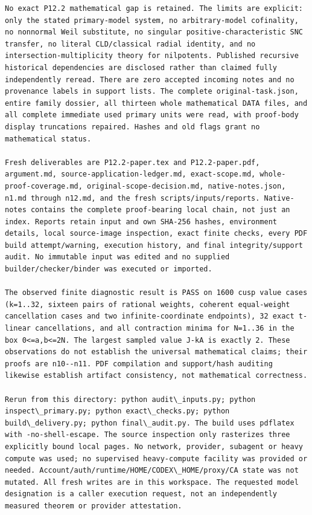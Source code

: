 \documentclass[11pt]{article}
\begin{document}
\begin{Verbatim}[breaklines,fontsize=\tiny]
No exact P12.2 mathematical gap is retained. The limits are explicit: only the stated primary-model system, no arbitrary-model cofinality, no nonnormal Weil substitute, no singular positive-characteristic SNC transfer, no literal CLD/classical radial identity, and no intersection-multiplicity theory for nilpotents. Published recursive historical dependencies are disclosed rather than claimed fully independently reread. There are zero accepted incoming notes and no provenance labels in support lists. The complete original-task.json, entire family dossier, all thirteen whole mathematical DATA files, and all complete immediate used primary units were read, with proof-body display truncations repaired. Hashes and old flags grant no mathematical status.

Fresh deliverables are P12.2-paper.tex and P12.2-paper.pdf, argument.md, source-application-ledger.md, exact-scope.md, whole-proof-coverage.md, original-scope-decision.md, native-notes.json, n1.md through n12.md, and the fresh scripts/inputs/reports. Native-notes contains the complete proof-bearing local chain, not just an index. Reports retain input and own SHA-256 hashes, environment details, local source-image inspection, exact finite checks, every PDF build attempt/warning, execution history, and final integrity/support audit. No immutable input was edited and no supplied builder/checker/binder was executed or imported.

The observed finite diagnostic result is PASS on 1600 cusp value cases (k=1..32, sixteen pairs of rational weights, coherent equal-weight cancellation cases and two infinite-coordinate endpoints), 32 exact t-linear cancellations, and all contraction minima for N=1..36 in the box 0<=a,b<=2N. The largest sampled value J-kA is exactly 2. These observations do not establish the universal mathematical claims; their proofs are n10--n11. PDF compilation and support/hash auditing likewise establish artifact consistency, not mathematical correctness.

Rerun from this directory: python audit\_inputs.py; python inspect\_primary.py; python exact\_checks.py; python build\_delivery.py; python final\_audit.py. The build uses pdflatex with -no-shell-escape. The source inspection only rasterizes three explicitly bound local pages. No network, provider, subagent or heavy compute was used; no supervised heavy-compute facility was provided or needed. Account/auth/runtime/HOME/CODEX\_HOME/proxy/CA state was not mutated. All fresh writes are in this workspace. The requested model designation is a caller execution request, not an independently measured theorem or provider attestation.


\end{Verbatim}
\end{document}
